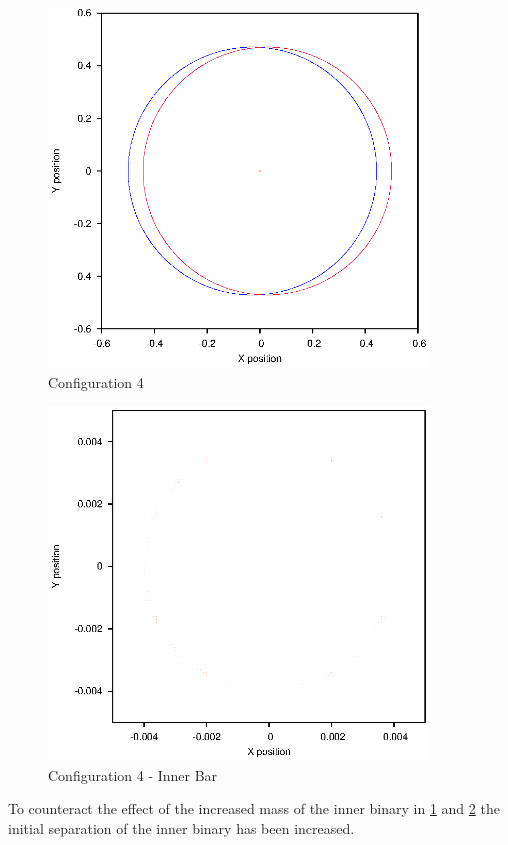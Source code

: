 \documentclass[a4paper,12pt]{article}
\begin{document}
\begin{figure}[H]
\centering
\includegraphics[width=0.9\textwidth]{./2016results/004-5-004/Orbit.eps}
\caption{Configuration 4}
\label{fig:config4}
\end{figure}
\begin{figure}[H]
\centering
\includegraphics[width=0.9\textwidth]{./2016results/004-5-004/Inner.eps}
\caption{Configuration 4 - Inner Bar}
\label{fig:config4i}
\end{figure}
To counteract the effect of the increased mass of the inner binary in \ref{fig:config4} and \ref{fig:config4i} the initial separation of the 
inner binary has been increased.
\end{document}
